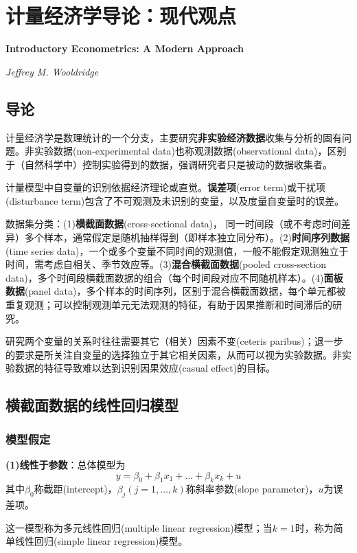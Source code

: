 \chapter{计量经济学导论：现代观点}
\Large\textbf{Introductory Econometrics: A Modern Approach}
\par \emph{Jeffrey M. Wooldridge} \normalsize

\section{导论}

\par 计量经济学是数理统计的一个分支，主要研究\textbf{非实验经济数据}收集与分析的固有问题。非实验数据(non-experimental data)也称观测数据(observational data)，区别于（自然科学中）控制实验得到的数据，强调研究者只是被动的数据收集者。

\par 计量模型中自变量的识别依据经济理论或直觉。\textbf{误差项}(error term)或干扰项(disturbance term)包含了不可观测及未识别的变量，以及度量自变量时的误差。

\par 数据集分类：(1)\textbf{横截面数据}(cross-sectional data)， 同一时间段（或不考虑时间差异）多个样本，通常假定是随机抽样得到（即样本独立同分布）。(2)\textbf{时间序列数据}(time series data)，一个或多个变量不同时间的观测值，一般不能假定观测独立于时间，需考虑自相关、季节效应等。(3)\textbf{混合横截面数据}(pooled cross-section data)，多个时间段横截面数据的组合（每个时间段对应不同随机样本）。(4)\textbf{面板数据}(panel data)，多个样本的时间序列，区别于混合横截面数据，每个单元都被重复观测；可以控制观测单元无法观测的特征，有助于因果推断和时间滞后的研究。

\par 研究两个变量的关系时往往需要其它（相关）因素不变(ceteris paribus)；退一步的要求是所关注自变量的选择独立于其它相关因素，从而可以视为实验数据。非实验数据的特征导致难以达到识别因果效应(casual effect)的目标。

\section{横截面数据的线性回归模型}

\subsection{模型假定}
\par \textbf{(1)线性于参数}：总体模型为
\begin{equation}
    y=\beta_0+\beta_1 x_1+\dots+\beta_k x_k +u
\end{equation}
其中$\beta_0$称截距(intercept)，$\beta_j(j=1,\dots,k)$称斜率参数(slope parameter)，$u$为误差项。
\par 这一模型称为多元线性回归(multiple linear regression)模型；当$k=1$时，称为简单线性回归(simple linear regression)模型。

